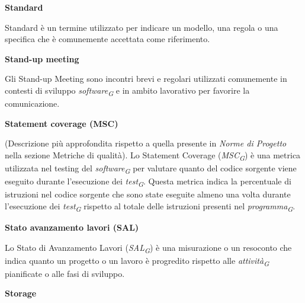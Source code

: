 \documentclass{article}
\begin{document}
\vspace{0.4cm}

\textbf{Standard}

\vspace{0.1cm}

Standard è un termine utilizzato per indicare un modello, una regola o una specifica che è comunemente accettata come riferimento.

\vspace{0.4cm}

\textbf{Stand-up meeting}

\vspace{0.1cm}

Gli Stand-up Meeting sono incontri brevi e regolari utilizzati comunemente in contesti di sviluppo \textit{software}\textsubscript{\textit{G}} e in ambito lavorativo per favorire la comunicazione.

\vspace{0.4cm}

\textbf{Statement coverage (MSC)}

\vspace{0.1cm}

(Descrizione più approfondita rispetto a quella presente in \textit{Norme di Progetto} nella sezione Metriche di qualità). Lo Statement Coverage (\textit{MSC}\textsubscript{\textit{G}}) è una metrica utilizzata nel testing del \textit{software}\textsubscript{\textit{G}} per valutare quanto del codice sorgente viene eseguito durante l'esecuzione dei \textit{test}\textsubscript{\textit{G}}.
Questa metrica indica la percentuale di istruzioni nel codice sorgente che sono state eseguite almeno una volta durante l'esecuzione dei \textit{test}\textsubscript{\textit{G}} rispetto al totale delle istruzioni presenti nel \textit{programma}\textsubscript{\textit{G}}. 

\vspace{0.4cm}

\textbf{Stato avanzamento lavori (SAL)}

\vspace{0.1cm}

Lo Stato di Avanzamento Lavori (\textit{SAL}\textsubscript{\textit{G}}) è una misurazione o un resoconto che indica quanto un progetto o un lavoro è progredito rispetto alle \textit{attività}\textsubscript{\textit{G}} pianificate o alle fasi di sviluppo.

\vspace{0.4cm}

\textbf{Storage}
\end{document}
